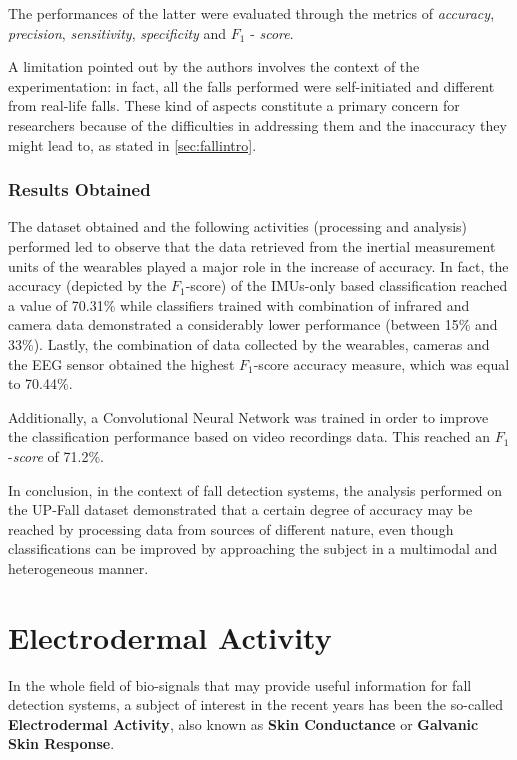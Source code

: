 The performances of the latter were evaluated through the metrics of \textit{accuracy}, \textit{precision}, \textit{sensitivity}, \textit{specificity} and $F_1$ - \textit{score}.

A limitation pointed out by the authors \cite{umafall} involves the context of the experimentation: in fact, all the falls performed were self-initiated and different from real-life falls. These kind of aspects constitute a primary concern for researchers because of the difficulties in addressing them and the inaccuracy they might lead to, as stated in  \ref{sec:fallintro}.

\subsubsection{Results Obtained}\label{subsubsec:upfall-results}

The dataset obtained and the following activities (processing and analysis) performed led to observe that the data retrieved from the inertial measurement units of the wearables played a major role in the increase of accuracy. In fact, the accuracy (depicted by the $F_1$-score) of the IMUs-only based classification reached a value of 70.31\% while classifiers trained with combination of infrared and camera data demonstrated a considerably lower performance (between 15\% and 33\%). Lastly, the combination of data collected by the wearables, cameras and the EEG sensor obtained the highest $F_1$-score accuracy measure, which was equal to 70.44\%. 

Additionally, a Convolutional Neural Network was trained in order to improve the classification performance based on video recordings data. This reached an $F_1$-\textit{score} of 71.2\%.

In conclusion, in the context of fall detection systems, the analysis performed on the UP-Fall dataset demonstrated that a certain degree of accuracy may be reached by processing data from sources of different nature, even though classifications can be improved by approaching the subject in a multimodal and heterogeneous manner.

\section{Electrodermal Activity}\label{sec:eda-description}

In the whole field of bio-signals that may provide useful information for fall detection systems, a subject of interest in the recent years has been the so-called \textbf{Electrodermal Activity}, also known as \textbf{Skin Conductance} or \textbf{Galvanic Skin Response}.

